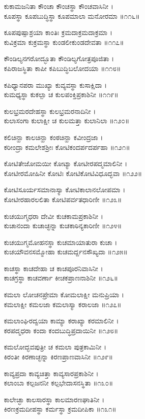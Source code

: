 ಕುಕಾಮಜನಿತಾ ಕೌಂಚಾ ಕೌಂಚಸ್ಥಾ ಕೌಂಚವಾಸಿನೀ ।\\
ಕೂಪಸ್ಥಾ ಕೂಪಬುದ್ಧಿಸ್ಥಾ ಕೂಪಮಾಲಾ ಮನೋರಮಾ ॥೧೧೬॥

ಕೂಪಪುಷ್ಪಾಶ್ರಯಾ ಕಾಂತಿಃ ಕ್ರಮದಾಕ್ರಮದಾಕ್ರಮಾ ।\\
ಕುವಿಕ್ರಮಾ ಕುಕ್ರಮಸ್ಥಾ ಕುಂಡಲೀಕುಂಡದೇವತಾ ॥೧೧೭॥

ಕೌಂಡಿಲ್ಯನಗರೋದ್ಭೂತಾ ಕೌಂಡಿಲ್ಯಗೋತ್ರಪೂಜಿತಾ ।\\
ಕಪಿರಾಜಸ್ಥಿತಾ ಕಾಪೀ ಕಪಿಬುದ್ಧಿಬಲೋದಯಾ ॥೧೧೮॥

ಕಪಿಧ್ಯಾನಪರಾ ಮುಖ್ಯಾ ಕುವ್ಯವಸ್ಥಾ ಕುಸಾಕ್ಷಿದಾ ।\\
ಕುಮಧ್ಯಸ್ಥಾ ಕುಕಲ್ಪಾ ಚ ಕುಲಪಂಕ್ತಿಪ್ರಕಾಶಿನೀ ॥೧೧೯॥

ಕುಲಭ್ರಮರದೇಹಸ್ಥಾ ಕುಲಭ್ರಮರನಾದಿನೀ ।\\
ಕುಲಾಸಂಗಾ ಕುಲಾಕ್ಷೀ ಚ ಕುಲಮತ್ತಾ ಕುಲಾನಿಲಾ ॥೧೨೦॥

ಕಲಿಚಿನ್ಹಾ ಕಾಲಚಿನ್ಹಾ ಕಂಠಚಿನ್ಹಾ ಕವೀಂದ್ರಜಾ ।\\
ಕರೀಂದ್ರಾ ಕಮಲೇಶಶ್ರೀಃ ಕೋಟಿಕಂದರ್ಪದರ್ಪಹಾ ॥೧೨೧॥

ಕೋಟಿತೇಜೋಮಯೀ ಕೋಟ್ಯಾ ಕೋಟೀರಪದ್ಮಮಾಲಿನೀ ।\\
ಕೋಟೀರಮೋಹಿನೀ ಕೋಟಿಃ ಕೋಟಿಕೋಟಿವಿಧೂದ್ಭವಾ ॥೧೨೨॥

ಕೋಟಿಸೂರ್ಯಸಮಾನಾಸ್ಯಾ ಕೋಟಿಕಾಲಾನಲೋಪಮಾ ।\\
ಕೋಟೀರಹಾರಲಲಿತಾ ಕೋಟಿಪರ್ವತಧಾರಿಣೀ ॥೧೨೩॥

ಕುಚಯುಗ್ಮಧರಾ ದೇವೀ ಕುಚಕಾಮಪ್ರಕಾಶಿನೀ ।\\
ಕುಚಾನಂದಾ ಕುಚಾಚ್ಛನ್ನಾ ಕುಚಕಾಠಿನ್ಯಕಾರಿಣೀ ॥೧೨೪॥

ಕುಚಯುಗ್ಮಮೋಹನಸ್ಥಾ ಕುಚಮಾಯಾತುರಾ ಕುಚಾ ।\\
ಕುಚಯೌವನಸಮ್ಮೋಹಾ ಕುಚಮರ್ದ್ದನಸೌಖ್ಯದಾ ॥೧೨೫॥

ಕಾಚಸ್ಥಾ ಕಾಚದೇಹಾ ಚ ಕಾಚಪೂರನಿವಾಸಿನೀ ।\\
ಕಾಚಗ್ರಸ್ಥಾ ಕಾಚವರ್ಣಾ ಕೀಚಕಪ್ರಾಣನಾಶಿನೀ ॥೧೨೬॥

ಕಮಲಾ ಲೋಚನಪ್ರೇಮಾ ಕೋಮಲಾಕ್ಷೀ ಮನುಪ್ರಿಯಾ ।\\
ಕಮಲಾಕ್ಷೀ ಕಮಲಜಾ ಕಮಲಾಸ್ಯಾ ಕರಾಲಜಾ ॥೧೨೭॥

ಕಮಲಾಂಘಿರದ್ವಯಾ ಕಾಮ್ಯಾ ಕರಾಖ್ಯಾ ಕರಮಾಲಿನೀ ।\\
ಕರಪದ್ಮಧರಾ ಕಂದಾ ಕಂದಬುದ್ಧಿಪ್ರದಾಯಿನೀ ॥೧೨೮॥

ಕಮಲೋದ್ಭವಪುತ್ರೀ ಚ ಕಮಲಾ ಪುತ್ರಕಾಮಿನೀ ।\\
ಕಿರಂತೀ ಕಿರಣಾಚ್ಛನ್ನಾ ಕಿರಣಪ್ರಾಣವಾಸಿನೀ ॥೧೨೯॥

ಕಾವ್ಯಪ್ರದಾ ಕಾವ್ಯಚಿತ್ತಾ ಕಾವ್ಯಸಾರಪ್ರಕಾಶಿನೀ ।\\
ಕಲಾಂಬಾ ಕಲ್ಪಜನನೀ ಕಲ್ಪಭೇದಾಸನಸ್ಥಿತಾ ॥೧೩೦॥

ಕಾಲೇಚ್ಛಾ ಕಾಲಸಾರಸ್ಥಾ ಕಾಲಮಾರಣಘಾತಿನೀ ।\\
ಕಿರಣಕ್ರಮದೀಪಸ್ಥಾ ಕರ್ಮಸ್ಥಾ ಕ್ರಮದೀಪಿಕಾ ॥೧೩೧॥

